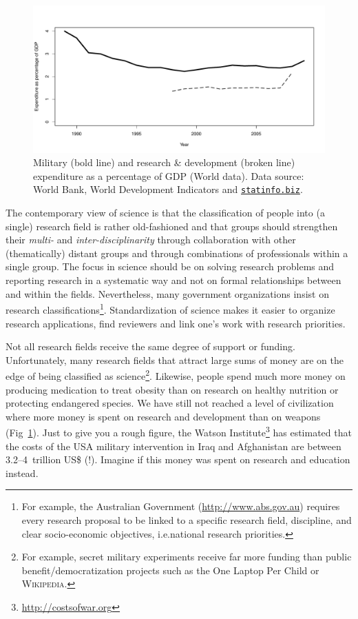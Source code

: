 \documentclass[graybox,envcountchap,sectrefs,UStrade]{svmono}
\begin{document}
\begin{figure}[!htb]
\begin{center}
  \includegraphics[width=\textwidth]{Fig_world_expenditure.pdf}
\caption{Military (bold line) and research \& development (broken line) expenditure as a percentage of GDP (World data). Data source: World Bank, World Development Indicators and \href{http://statinfo.biz}{\texttt{statinfo.biz}}.} \label{Fig:world_expenditure}
\end{center}
\end{figure}

The contemporary view of science is that the classification of people into (a single) research field is rather old-fashioned and that groups should strengthen their \emph{multi-} and \emph{inter-disciplinarity} through collaboration with other (thematically) distant groups and through combinations of professionals within a single group. The focus in science should be on solving research problems and reporting research in a systematic way and not on formal relationships between and within the fields. Nevertheless, many government organizations insist on research classifications\footnote{For example, the Australian Government (\url{http://www.abs.gov.au}) requires every research proposal to be linked to a specific research field, discipline, and clear socio-economic objectives, i.e.\@ national research priorities.}. Standardization of science makes it easier to organize research applications, find reviewers and link one's work with research priorities. \par

Not all research fields receive the same degree of support or funding. Unfortunately, many research fields that attract large sums of money are on the edge of being classified as science\footnote{For example, secret military experiments receive far more funding than public benefit/democratization projects such as the One Laptop Per Child or \textsc{Wikipedia}.}. Likewise, people spend much more money on producing medication to treat obesity than on research on healthy nutrition or protecting endangered species. We have still not reached a level of civilization where more money is spent on research and development than on weapons (Fig~\ref{Fig:world_expenditure}). Just to give you a rough figure, the Watson Institute\footnote{\url{http://costsofwar.org}} has estimated that the costs of the USA military intervention in Iraq and Afghanistan are between 3.2--4~trillion US\$ (!). Imagine if this money was spent on research and education instead. \par
\end{document}
